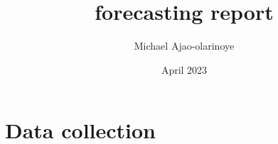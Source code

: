 \documentclass[12pt, letterpaper]{article}
\title{forecasting report}
\author{Michael Ajao-olarinoye}
\date{April 2023}
\begin{document}
\maketitle

\section{Data collection}
\end{document}
